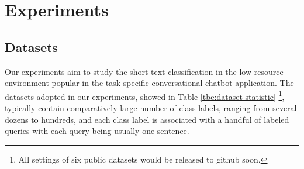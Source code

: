 \section{Experiments}
\label{sec:exp}

\begin{table}
  \begin{centering}
    \par
  \end{centering}
  \caption{Statistics for all datasets and few shot settings.}

  \label{tbe:dataset statistic}
\end{table}

\subsection{Datasets}
Our experiments aim to study the short text classification in the low-resource environment popular in the task-specific conversational chatbot application.
The datasets adopted in our experiments, showed in Table \ref{tbe:dataset statistic} \footnote{All settings of six public datasets would be released to github soon.}, typically contain comparatively large number of class labels, ranging from several dozens to hundreds, and each class label is associated with a handful of labeled queries with each query being usually one sentence. 

